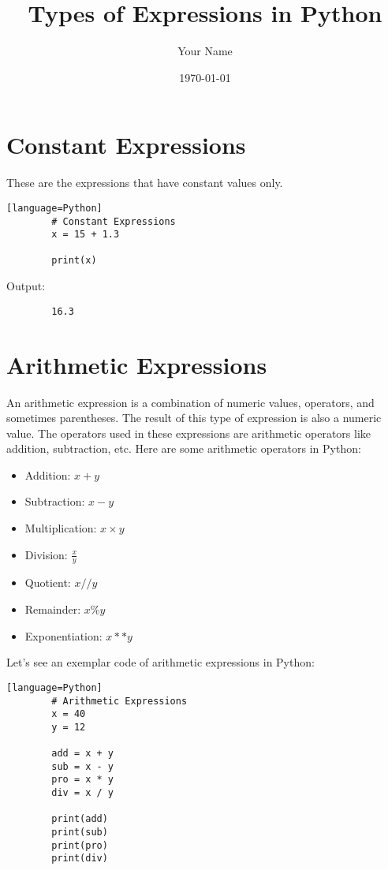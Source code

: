 \documentclass{article}
\begin{document}
	
	\title{Types of Expressions in Python}
	\author{Your Name}
	\date{\today}
	\maketitle
	
	\section{Constant Expressions}
	
	These are the expressions that have constant values only.
	
	\begin{verbatim}[language=Python]
		# Constant Expressions 
		x = 15 + 1.3
		
		print(x)
	\end{verbatim}
	
	Output:
	\begin{verbatim}
		16.3
	\end{verbatim}
	
	\section{Arithmetic Expressions}
	
	An arithmetic expression is a combination of numeric values, operators, and sometimes parentheses. The result of this type of expression is also a numeric value. The operators used in these expressions are arithmetic operators like addition, subtraction, etc. Here are some arithmetic operators in Python:
	
	\begin{itemize}
		\item Addition: $x + y$
		\item Subtraction: $x - y$
		\item Multiplication: $x \times y$
		\item Division: $\frac{x}{y}$
		\item Quotient: $x // y$
		\item Remainder: $x \% y$
		\item Exponentiation: $x ** y$
	\end{itemize}
	
	Let’s see an exemplar code of arithmetic expressions in Python:
	
	\begin{verbatim}[language=Python]
		# Arithmetic Expressions 
		x = 40
		y = 12
		
		add = x + y 
		sub = x - y 
		pro = x * y 
		div = x / y 
		
		print(add) 
		print(sub) 
		print(pro) 
		print(div)
	\end{verbatim}
	
\end{document}
